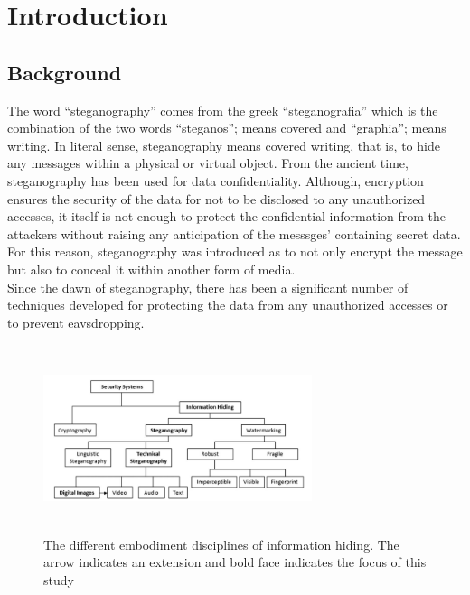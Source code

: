 \documentclass{report}
\begin{document}
\restoregeometry
\newpage
\tableofcontents
\thispagestyle{empty} %

\newpage
\listoffigures
\thispagestyle{empty} %

\newpage
{}
\chapter{Introduction}
\section{Background}
The word “steganography” comes from the greek “steganografia” which is the combination of the two words “steganos”; means covered and “graphia”; means writing. In literal sense, steganography means covered writing, that is, to hide any messages within a physical or virtual object. From the ancient time, steganography has been used for data confidentiality. Although, encryption ensures the security of the data for not to be disclosed to any unauthorized accesses, it itself is not enough to protect the confidential information from the attackers without raising any anticipation of the messsges’ containing secret data. For this reason, steganography was introduced as to not only encrypt the message but also to conceal it within another form of media.\\

Since the dawn of steganography, there has been a significant number of techniques developed for protecting the data from any unauthorized accesses or to prevent eavsdropping. \\


\begin{figure}[htbp]
  \centering
  \includegraphics[width=0.7\textwidth, height=5.5cm]{image2.png} 
  \caption{The different embodiment disciplines of information hiding. The arrow indicates an extension and bold face indicates the focus of this study \cite{cheddad2010digital}}
  \label{fig:1}
\end{figure}
\end{document}
